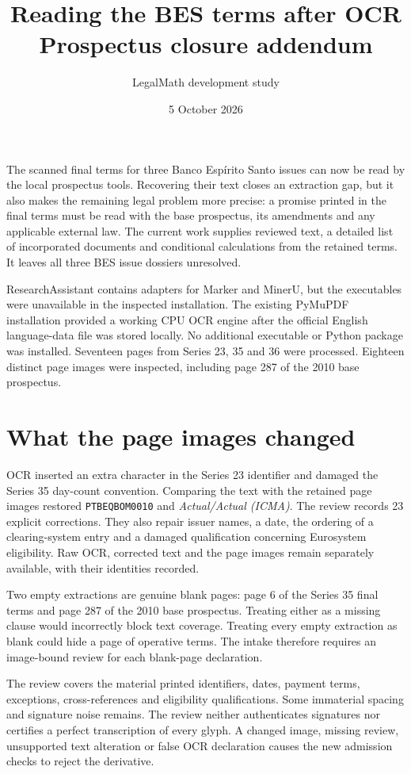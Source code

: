 \documentclass[11pt,a4paper]{article}
\title{Reading the BES terms after OCR\\Prospectus closure addendum}
\author{LegalMath development study}
\date{5 October 2026}
\begin{document}
\maketitle

The scanned final terms for three Banco Esp\'irito Santo issues can now be read
by the local prospectus tools. Recovering their text closes an extraction gap,
but it also makes the remaining legal problem more precise: a promise printed
in the final terms must be read with the base prospectus, its amendments and
any applicable external law. The current work supplies reviewed text,
a detailed list of incorporated documents and conditional calculations from
the retained terms. It leaves all three BES issue dossiers unresolved.

ResearchAssistant contains adapters for Marker and MinerU, but the executables
were unavailable in the inspected installation. The existing PyMuPDF installation
provided a working CPU OCR engine after the official English language-data file
was stored locally. No additional executable or Python package was installed.
Seventeen pages from Series 23, 35 and 36 were processed. Eighteen distinct page
images were inspected, including page 287 of the 2010 base prospectus.

\section*{What the page images changed}

OCR inserted an extra character in the Series 23 identifier and damaged the
Series 35 day-count convention. Comparing the text with the retained page images
restored \texttt{PTBEQBOM0010} and \emph{Actual/Actual (ICMA)}. The review records
23 explicit corrections. They also repair issuer names, a date, the ordering of
a clearing-system entry and a damaged qualification concerning Eurosystem
eligibility. Raw OCR, corrected text and the page images remain separately
available, with their identities recorded.

Two empty extractions are genuine blank pages: page 6 of the Series 35 final
terms and page 287 of the 2010 base prospectus. Treating either as a missing
clause would incorrectly block text coverage. Treating every empty extraction
as blank could hide a page of operative terms. The intake
therefore requires an image-bound review for each blank-page declaration.

The review covers the material printed identifiers, dates, payment terms,
exceptions, cross-references and eligibility qualifications. Some immaterial
spacing and signature noise remains. The review neither authenticates signatures
nor certifies a perfect transcription of every glyph. A changed image, missing
review, unsupported text alteration or false OCR declaration causes the new
admission checks to reject the derivative.
\end{document}

